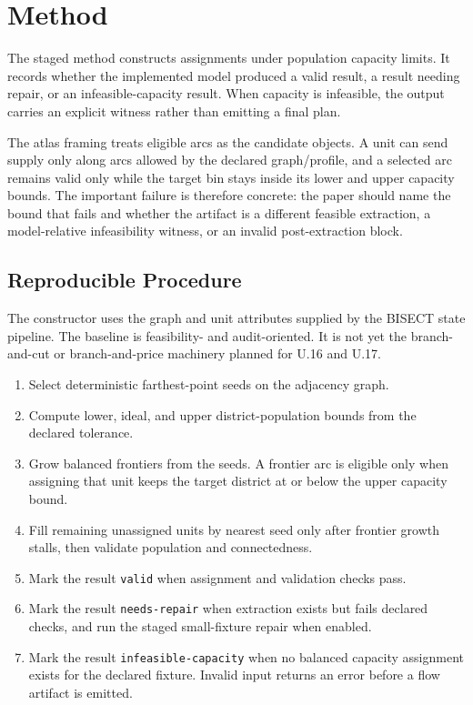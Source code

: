 \section{Method}

The staged method constructs assignments under population capacity limits. It
records whether the implemented model produced a valid result, a result needing
repair, or an infeasible-capacity result. When capacity is infeasible, the
output carries an explicit witness rather than emitting a final plan.

The atlas framing treats eligible arcs as the candidate objects. A unit can
send supply only along arcs allowed by the declared graph/profile, and a
selected arc remains valid only while the target bin stays inside its lower and
upper capacity bounds. The important failure is therefore concrete: the paper
should name the bound that fails and whether the artifact is a different
feasible extraction, a model-relative infeasibility witness, or an invalid
post-extraction block.

\subsection{Reproducible Procedure}

The constructor uses the graph and unit attributes supplied by the BISECT state
pipeline. The baseline is feasibility- and audit-oriented. It is not yet the
branch-and-cut or branch-and-price machinery planned for U.16 and U.17.

\begin{enumerate}
  \item Select deterministic farthest-point seeds on the adjacency graph.
  \item Compute lower, ideal, and upper district-population bounds from the
        declared tolerance.
  \item Grow balanced frontiers from the seeds. A frontier arc is eligible only
        when assigning that unit keeps the target district at or below the
        upper capacity bound.
  \item Fill remaining unassigned units by nearest seed only after frontier
        growth stalls, then validate population and connectedness.
  \item Mark the result \texttt{valid} when assignment and validation checks
        pass.
  \item Mark the result \texttt{needs-repair} when extraction exists but fails
        declared checks, and run the staged small-fixture repair when enabled.
  \item Mark the result \texttt{infeasible-capacity} when no balanced capacity
        assignment exists for the declared fixture. Invalid input returns an
        error before a flow artifact is emitted.
\end{enumerate}

